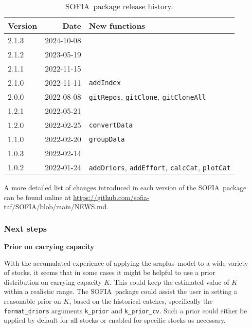 \documentclass[12pt]{article}
\newcommand\blue[1]{\textcolor{darkblue}{#1}}
\newcommand\I[1]{\rule{0pt}{#1}}
\newcommand\SOFIA{{\sf SOFIA}}
\newcommand\sraplus{{\sf sraplus}}
\begin{document}
\begin{table}[htb]\small
  \caption{\SOFIA\ package release history.}
  \centering
  \begin{tabular}{lrl}
    \hline
    Version & Date & New functions\\
    \hline
    2.1.3   & 2024-10-08 & ~\I{2.3ex}\\
    2.1.2   & 2023-05-19 & ~\\
    2.1.1   & 2022-11-15 & ~\\
    2.1.0   & 2022-11-11 & \verb|addIndex|\\[0.5ex]
    2.0.0   & 2022-08-08 & \verb|gitRepos|, \verb|gitClone|,
                           \verb|gitCloneAll|\\[0.5ex]
    1.2.1   & 2022-05-21 & ~\\
    1.2.0   & 2022-02-25 & \verb|convertData|\\[0.5ex]
    1.1.0   & 2022-02-20 & \verb|groupData|\\[0.5ex]
    1.0.3   & 2022-02-14 & ~\\
    1.0.2   & 2022-01-24 & \verb|addDriors|, \verb|addEffort|, \verb|calcCat|,
                           \verb|plotCat|\\
    \hline
  \end{tabular}
  \label{tab:package-history}
  \vspace{1.5ex}
\end{table}

A more detailed list of changes introduced in each version of the \SOFIA\
package can be found online at
\blue{\url{https://github.com/sofia-taf/SOFIA/blob/main/NEWS.md}}.

\subsubsection{Next steps}

\textbf{Prior on carrying capacity}

With the accumulated experience of applying the \sraplus\ model to a wide
variety of stocks, it seems that in some cases it might be helpful to use a
prior distribution on carrying capacity $K$. This could keep the estimated value
of $K$ within a realistic range. The \SOFIA\ package could assist the user in
setting a reasonable prior on $K$, based on the historical catches, specifically
the \verb|format_driors| arguments \verb|k_prior| and \verb|k_prior_cv|. Such a
prior could either be applied by default for all stocks or enabled for specific
stocks as necessary.\\[-2ex]
\end{document}

